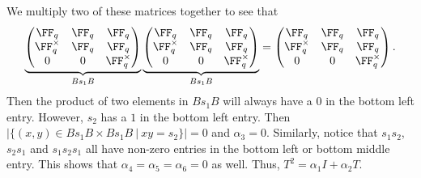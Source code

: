 \documentclass[11pt]{amsart}
\theoremstyle{remark}
\begin{document}
We multiply two of these matrices together to see that
\[
	\underbrace{\begin{pmatrix}
			\FF_q        & \FF_q & \FF_q        \\
			\FF_q^\times & \FF_q & \FF_q        \\
			0            & 0     & \FF_q^\times
		\end{pmatrix}}_{Bs_1B}
	\underbrace{\begin{pmatrix}
			\FF_q        & \FF_q & \FF_q        \\
			\FF_q^\times & \FF_q & \FF_q        \\
			0            & 0     & \FF_q^\times
		\end{pmatrix}}_{Bs_1B} =
	\begin{pmatrix}
		\FF_q        & \FF_q & \FF_q        \\
		\FF_q^\times & \FF_q & \FF_q        \\
		0            & 0     & \FF_q^\times
	\end{pmatrix}.
\]
Then the product of two elements in $Bs_1B$ will always have a $0$ in the bottom left entry.
However, $s_2$ has a $1$ in the bottom left entry.
Then $|\{(x,y)\in Bs_1B\times Bs_1B\ |\ xy=s_2\}| = 0$ and $\alpha_3=0$.
Similarly, notice that $s_1s_2$, $s_2s_1$ and $s_1s_2s_1$ all have non-zero entries in the bottom left or bottom middle entry.
This shows that $\alpha_4=\alpha_5=\alpha_6=0$ as well.
Thus, $T^2 = \alpha_1 I + \alpha_2 T$.
\end{document}
